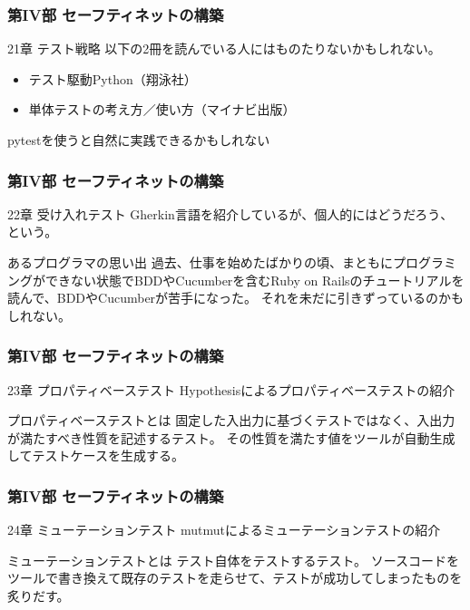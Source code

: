 \documentclass[aspectratio=169,dvipdfmx,12pt,notheorems]{beamer}
\theoremstyle{definition}
\begin{document}
\begin{frame}\frametitle{第IV部 セーフティネットの構築}

\begin{block}{21章 テスト戦略}
以下の2冊を読んでいる人にはものたりないかもしれない。
\begin{itemize}
\item テスト駆動Python（翔泳社）
\item 単体テストの考え方／使い方（マイナビ出版）
\end{itemize}
pytestを使うと自然に実践できるかもしれない
\end{block}

\end{frame}

\begin{frame}\frametitle{第IV部 セーフティネットの構築}

\begin{block}{22章 受け入れテスト}
Gherkin言語を紹介しているが、個人的にはどうだろう、という。
\end{block}

\begin{alertblock}{あるプログラマの思い出}
過去、仕事を始めたばかりの頃、まともにプログラミングができない状態でBDDやCucumberを含むRuby on Railsのチュートリアルを読んで、BDDやCucumberが苦手になった。
それを未だに引きずっているのかもしれない。
\end{alertblock}
\end{frame}

\begin{frame}\frametitle{第IV部 セーフティネットの構築}

\begin{block}{23章 プロパティベーステスト}
Hypothesisによるプロパティベーステストの紹介
\end{block}

\begin{exampleblock}{プロパティベーステストとは}
固定した入出力に基づくテストではなく、入出力が満たすべき性質を記述するテスト。
その性質を満たす値をツールが自動生成してテストケースを生成する。
\end{exampleblock}

\end{frame}

\begin{frame}\frametitle{第IV部 セーフティネットの構築}

\begin{block}{24章 ミューテーションテスト}
mutmutによるミューテーションテストの紹介
\end{block}

\begin{exampleblock}{ミューテーションテストとは}
テスト自体をテストするテスト。
ソースコードをツールで書き換えて既存のテストを走らせて、テストが成功してしまったものを炙りだす。
\end{exampleblock}

\end{frame}
\end{document}
